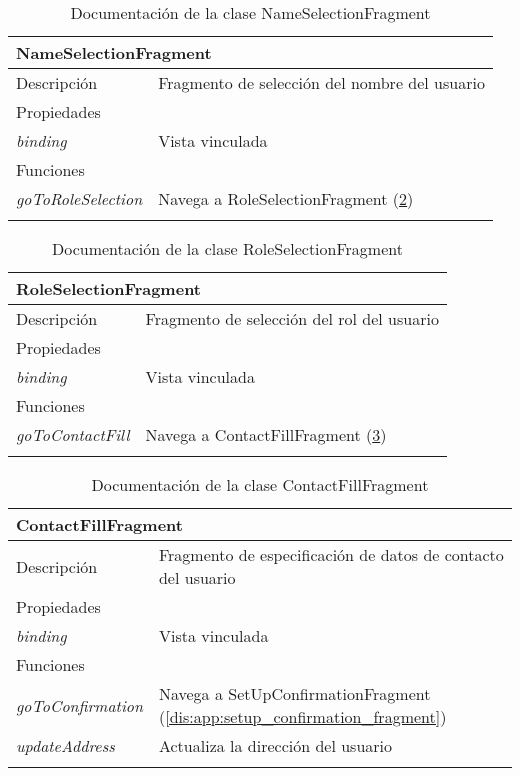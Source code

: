 \begin{longtable}{|p{} p{}|}
    \hline
    \multicolumn{2}{|l|}{\textbf{NameSelectionFragment}} \\ \hline \hline
    Descripción      & Fragmento de selección del nombre del usuario \\ \hline
    \multicolumn{2}{|l|}{Propiedades} \\
    \emph{binding}  & Vista vinculada  \\ \hline
    \multicolumn{2}{|l|}{Funciones} \\
    \emph{goToRoleSelection}  & Navega a RoleSelectionFragment (\ref{dis:app:role_selection_fragment}) \\ \hline
    \caption{Documentación de la clase NameSelectionFragment}
    \label{dis:app:name_selection_fragment}
\end{longtable}

\hspace{\textwidth}

\begin{longtable}{|p{} p{}|}
    \hline
    \multicolumn{2}{|l|}{\textbf{RoleSelectionFragment}} \\ \hline \hline
    Descripción      & Fragmento de selección del rol del usuario \\ \hline
    \multicolumn{2}{|l|}{Propiedades} \\
    \emph{binding}  & Vista vinculada  \\ \hline
    \multicolumn{2}{|l|}{Funciones} \\
    \emph{goToContactFill}  & Navega a ContactFillFragment (\ref{dis:app:contact_fill_fragment}) \\ \hline
    \caption{Documentación de la clase RoleSelectionFragment}
    \label{dis:app:role_selection_fragment}
\end{longtable}

\vspace{-20pt}
\begin{longtable}{|p{} p{}|}
    \hline
    \multicolumn{2}{|l|}{\textbf{ContactFillFragment}} \\ \hline \hline
    Descripción      & Fragmento de especificación de datos de contacto del usuario \\ \hline
    \multicolumn{2}{|l|}{Propiedades} \\
    \emph{binding}  & Vista vinculada  \\ \hline
    \multicolumn{2}{|l|}{Funciones} \\
    \emph{goToConfirmation}  & Navega a SetUpConfirmationFragment (\ref{dis:app:setup_confirmation_fragment}) \\
    \emph{updateAddress}  & Actualiza la dirección del usuario  \\ \hline
    \caption{Documentación de la clase ContactFillFragment}
    \label{dis:app:contact_fill_fragment}
\end{longtable}

